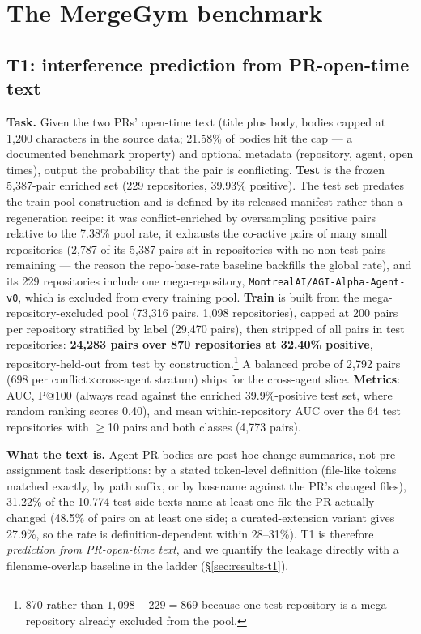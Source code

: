 \documentclass{article}
\begin{document}
\section{The MergeGym benchmark}
\label{sec:benchmark}

\subsection{T1: interference prediction from PR-open-time text}
\label{sec:t1}

\textbf{Task.} Given the two PRs' open-time text (title plus body, bodies capped at 1{,}200 characters in the source data; 21.58\% of bodies hit the cap --- a documented benchmark property) and optional metadata (repository, agent, open times), output the probability that the pair is conflicting. %
\textbf{Test} is the frozen 5{,}387-pair enriched set (229 repositories, 39.93\% positive). The test set predates the train-pool construction and is defined by its released manifest rather than a regeneration recipe: it was conflict-enriched by oversampling positive pairs relative to the 7.38\% pool rate, it exhausts the co-active pairs of many small repositories (2{,}787 of its 5{,}387 pairs sit in repositories with no non-test pairs remaining --- the reason the repo-base-rate baseline backfills the global rate), and its 229 repositories include one mega-repository, \texttt{MontrealAI/AGI-Alpha-Agent-v0}, which is excluded from every training pool. %
\textbf{Train} is built from the mega-repository-excluded pool (73{,}316 pairs, 1{,}098 repositories), capped at 200 pairs per repository stratified by label (29{,}470 pairs), then stripped of all pairs in test repositories: \textbf{24{,}283 pairs over 870 repositories at 32.40\% positive}, repository-held-out from test by construction.\footnote{870 rather than $1{,}098-229=869$ because one test repository is a mega-repository already excluded from the pool.} %
A balanced probe of 2{,}792 pairs (698 per conflict$\times$cross-agent stratum) ships for the cross-agent slice. %
\textbf{Metrics}: AUC, P@100 (always read against the enriched 39.9\%-positive test set, where random ranking scores 0.40), and mean within-repository AUC over the 64 test repositories with $\geq$10 pairs and both classes (4{,}773 pairs). %

\textbf{What the text is.} Agent PR bodies are post-hoc change summaries, not pre-assignment task descriptions: by a stated token-level definition (file-like tokens matched exactly, by path suffix, or by basename against the PR's changed files), 31.22\% of the 10{,}774 test-side texts name at least one file the PR actually changed (48.5\% of pairs on at least one side; a curated-extension variant gives 27.9\%, so the rate is definition-dependent within 28--31\%). %
T1 is therefore \emph{prediction from PR-open-time text}, and we quantify the leakage directly with a filename-overlap baseline in the ladder (\S\ref{sec:results-t1}).
\end{document}

